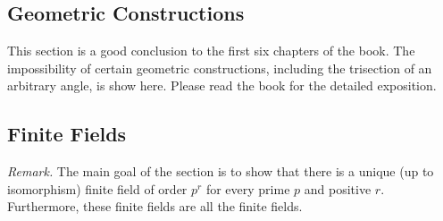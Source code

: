 \documentclass[11pt]{article}
\newcommand{\rmk}{\noindent\textit{Remark. }}
\begin{document}
\subsection{Geometric Constructions}
This section is a good conclusion to the first six chapters of the book. The impossibility of certain geometric constructions, including the trisection of an arbitrary angle, is show here. Please read the book for the detailed exposition.

\subsection{Finite Fields}
\rmk The main goal of the section is to show that there is a unique (up to isomorphism) finite field of order $p^r$ for every prime $p$ and positive $r$. Furthermore, these finite fields are all the finite fields.
\end{document}
